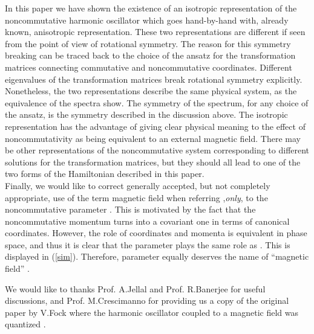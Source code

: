 \documentclass[a4paper,aps,prd,preprint]{revtex4}
\begin{document}
    In this paper we have shown the existence of an isotropic representation
    of the noncommutative harmonic oscillator which goes hand-by-hand with,
    already known, anisotropic representation. These two representations are
    different if seen from the point of view of rotational symmetry. The
    reason for this symmetry breaking can be traced back to the choice of the
    ansatz for the transformation matrices connecting commutative and
    noncommutative coordinates. Different eigenvalues of the  transformation
    matrices break rotational symmetry explicitly. Nonetheless, the two
    representations describe the same physical system,  as the
    equivalence of the spectra show. 
    The symmetry of the spectrum, for any choice of the ansatz, is the \coordHE{} 
    symmetry described in the discussion above. 
    The isotropic representation has the advantage of giving clear physical
    meaning to the effect of noncommutativity as being equivalent to an external
    magnetic field.  There may be other representations  of
    the noncommutative system corresponding to different  solutions for
    the transformation matrices, but they should all lead to one of the
    two forms of the Hamiltonian described in this paper.\\
    Finally, we would like to correct generally
    accepted, but not completely appropriate, use of the term magnetic field 
    when referring ,{\it only}, to  the noncommutative parameter \coordHE{}. This is
    motivated by the fact that the noncommutative momentum turns into
    a covariant one in terms of canonical coordinates. However, the role
    of coordinates and momenta is equivalent in phase space, and thus
    it is  clear that the parameter \myHighlight{$\theta$}\coordHE{} plays  the same role as \coordHE{}. 
    This is displayed in (\ref{sim}). Therefore, parameter \myHighlight{$\theta$}\coordHE{}
    equally deserves the name of ``magnetic field'' \cite{baner}. 
   
   \begin{acknowledgments}
   We would like to thanks Prof. A.Jellal and Prof. R.Banerjee for useful
    discussions, and Prof. M.Crescimanno for providing us a copy of the original
   paper by V.Fock where the \coordHE{} harmonic oscillator coupled to a magnetic
   field was quantized \cite{fock}.
   \end{acknowledgments}
   
\end{document}
